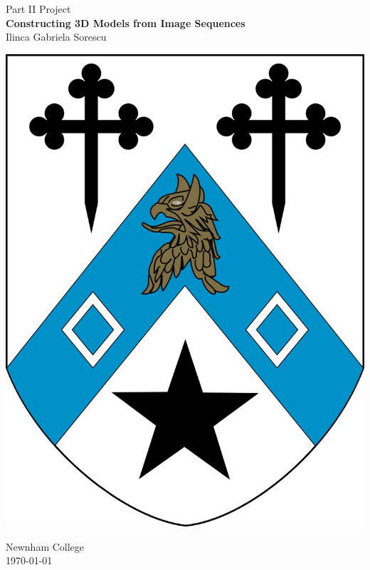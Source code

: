 \documentclass[12pt,a4paper,twoside,openright]{report}
\begin{document}




\pagestyle{empty}


\begin{center}
\begin{Huge}
Part II Project\\
\textbf{Constructing 3D Models from Image Sequences} \\[5mm]
Ilinca Gabriela Sorescu \\
\end{Huge}
\vspace*{10mm}
\centerline{\includegraphics[scale=0.2]{figs/Newnham_crest.png}}
\Large Newnham College \\
\vspace*{65mm}
\large \today %
\end{center}
\end{document}
